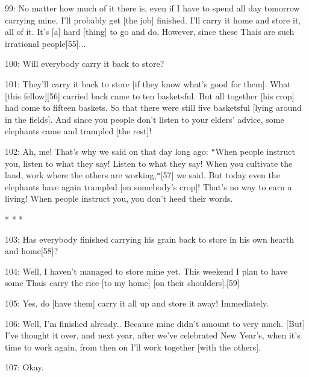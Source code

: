 99: No matter how much of it there is, even if I have to spend all day tomorrow
carrying mine, I'll probably get [the job] finished. I'll carry it home and store
it, all of it. It's [a] hard [thing] to go and do. However, since these Thais are
such irrational people\.[55]...

100: Will everybody carry it back to store?

101: They'll carry it back to store [if they know what's good for them]. What [this
fellow][56]\textbf{ }carried back came to ten basketsful. But all together [his
crop] had come to fifteen baskets. So that there were still five basketsful [lying
around in the fields]. And since you people don't listen to your elders' advice,
some elephants came and trampled [the rest]!

102: Ah, me! That's why we said on that day long ago: \texttt{"}When people instruct
you, listen to what they say! Listen to what they say! When you cultivate the land,
work where the others are working,\texttt{"}[57] we said. But today even the elephants
have again trampled [on somebody's crop]! That's no way to earn a living! When
people instruct you, you don't heed their words.

\begin{center}
* * *
\end{center}

\leftskip=0pt
103: Has everybody finished carrying his grain back to store in his own hearth
and home[58]?

104: Well, I haven't managed to store mine yet. This weekend I plan to have some
Thais carry the rice [to my home] [on their shoulders].[59]

105: Yes, do [have them] carry it all up and store it away! Immediately.

106: Well, I'm finished already.. Because mine didn't amount to very much. [But]
I've thought it over, and next year, after we've celebrated New Year's, when it's
time to work again, from then on I'll work together [with the others].

107: Okay.

